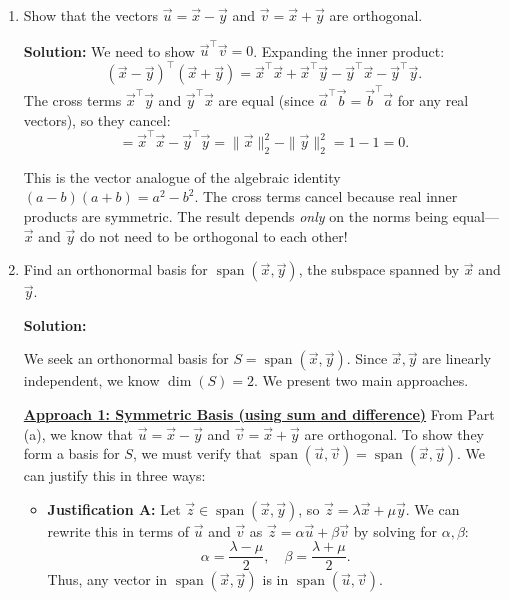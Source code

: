 \documentclass[10pt]{article}
\theoremstyle{definition}
\theoremstyle{plain}
\DeclareMathOperator{\spn}{span}
\begin{document}
\begin{enumerate}[label=(\alph*)]
    \item Show that the vectors $\vec{u} = \vec{x} - \vec{y}$ and $\vec{v} = \vec{x} + \vec{y}$ are orthogonal.

    \textbf{Solution:} We need to show $\vec{u}^\top \vec{v} = 0$. Expanding the inner product:
    \begin{equation}
        (\vec{x} - \vec{y})^\top (\vec{x} + \vec{y}) = \vec{x}^\top \vec{x} + \vec{x}^\top \vec{y} - \vec{y}^\top \vec{x} - \vec{y}^\top \vec{y}.
    \end{equation}
    The cross terms $\vec{x}^\top \vec{y}$ and $\vec{y}^\top \vec{x}$ are equal (since $\vec{a}^\top \vec{b} = \vec{b}^\top \vec{a}$ for any real vectors), so they cancel:
    \begin{equation}
        = \vec{x}^\top \vec{x} - \vec{y}^\top \vec{y} = \|\vec{x}\|_2^2 - \|\vec{y}\|_2^2 = 1 - 1 = 0.
    \end{equation}

    \begin{intuition}
    This is the vector analogue of the algebraic identity $(a - b)(a + b) = a^2 - b^2$. The cross terms cancel because real inner products are symmetric. The result depends \emph{only} on the norms being equal---$\vec{x}$ and $\vec{y}$ do not need to be orthogonal to each other!
    \end{intuition}

    \item Find an orthonormal basis for $\spn(\vec{x}, \vec{y})$, the subspace spanned by $\vec{x}$ and $\vec{y}$.

    \textbf{Solution:}

    We seek an orthonormal basis for $S = \spn(\vec{x}, \vec{y})$. Since $\vec{x}, \vec{y}$ are linearly independent, we know $\dim(S) = 2$. We present two main approaches.

    \textbf{\underline{Approach 1: Symmetric Basis (using sum and difference)}} \quad From Part (a), we know that $\vec{u} = \vec{x} - \vec{y}$ and $\vec{v} = \vec{x} + \vec{y}$ are orthogonal. To show they form a basis for $S$, we must verify that $\spn(\vec{u}, \vec{v}) = \spn(\vec{x}, \vec{y})$. We can justify this in three ways:

    \begin{itemize}
        \item \textbf{Justification A:} Let $\vec{z} \in \spn(\vec{x}, \vec{y})$, so $\vec{z} = \lambda \vec{x} + \mu \vec{y}$. We can rewrite this in terms of $\vec{u}$ and $\vec{v}$ as $\vec{z} = \alpha \vec{u} + \beta \vec{v}$ by solving for $\alpha, \beta$:
        \begin{equation}
            \alpha = \frac{\lambda - \mu}{2}, \quad \beta = \frac{\lambda + \mu}{2}.
        \end{equation}
        Thus, any vector in $\spn(\vec{x}, \vec{y})$ is in $\spn(\vec{u}, \vec{v})$.


\end{itemize}
\end{enumerate}
\end{document}
